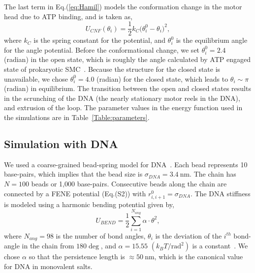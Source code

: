 \documentclass[aps,preprint]{revtex4-1}
\newcommand{\nm}{\ \mathrm{nm}}
\begin{document}
The last term in Eq.(\ref{eq:Hamil}) models the conformation change in the motor head  due to ATP binding, and is taken as, 
\begin{equation} 
\label{}
U_{CNF}^{}(\theta_{i})= \frac{1}{2}k_C\big(\theta^0_i-\theta_i\big)^2,
\end{equation}
where $k_C$ is the spring constant for the potential, and $\theta^0_i$ is the equilibrium angle for the angle potential. Before the conformational change, we set $\theta_i^0=2.4$ (radian) in the open state, which is roughly the angle calculated by ATP engaged state of  prokaryotic SMC~\cite{diebold2017structure}. Because the structure for the closed state is unavailable, we chose $\theta_i^0=4.0$ (radian) for the closed state, which leads to $\theta_i\sim \pi$ (radian) in equilibrium. The transition between the open and closed states results in the scrunching of the DNA (the nearly stationary motor reels in the DNA), and extrusion of the loop.
The parameter values in the energy function used in the simulations are in Table~\ref{Table:parameters}. 


\subsection{Simulation with DNA}
We used a coarse-grained bead-spring model for DNA~\cite{hyeon2006kinetics,dey2017toroidal}. Each bead represents 10 base-pairs, which implies that the bead size is $\sigma_{DNA}=3.4 \nm$. The chain has $N=100$ beads or 1,000 base-pairs. Consecutive beads along the chain are  connected by a FENE potential (Eq.(S2)) with $r^0_{i,i+1}=\sigma_{DNA}$. The DNA stiffness is modeled using a harmonic bending potential given by,
\begin{equation}
    U_{BEND} = \frac{1}{2}\sum_{i=1}^{N_{ang}}\alpha\cdot\theta^2,
\end{equation}
where $N_{ang}=98$ is the number of bond angles, $\theta_i$ is the deviation of the $i^{th}$ bond-angle in the chain from $180\deg$, and $\alpha = 15.55$ $(k_B T /\text{rad}^2)$ is a constant~\cite{hyeon2006kinetics}. We chose  $\alpha$ so that the persistence length is $\approx 50\nm$, which is the canonical value for DNA in monovalent salts.   %
\end{document}
